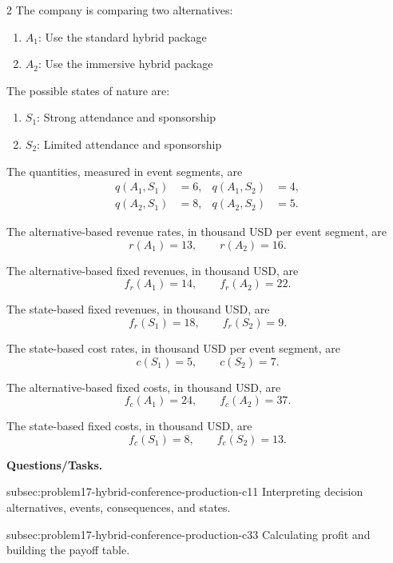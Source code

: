 \begin{multicols}{2}
	The company is comparing two alternatives:
	\begin{enumerate}[label=\arabic*.]
		\item \(A_1\): Use the standard hybrid package
		\item \(A_2\): Use the immersive hybrid package
	\end{enumerate}
	
	The possible states of nature are:
	\begin{enumerate}[label=\arabic*.]
		\item \(S_1\): Strong attendance and sponsorship
		\item \(S_2\): Limited attendance and sponsorship
	\end{enumerate}
	
	\columnbreak
	
	The quantities, measured in event segments, are
	\[
	\begin{aligned}
		q(A_1,S_1)&=6,
		&
		q(A_1,S_2)&=4,
		\\
		q(A_2,S_1)&=8,
		&
		q(A_2,S_2)&=5.
	\end{aligned}
	\]
	
	The alternative-based revenue rates, in thousand USD per event segment,
	are
	\[
	r(A_1)=13,
	\qquad
	r(A_2)=16.
	\]
	
	The alternative-based fixed revenues, in thousand USD, are
	\[
	f_r(A_1)=14,
	\qquad
	f_r(A_2)=22.
	\]
	
	The state-based fixed revenues, in thousand USD, are
	\[
	f_r(S_1)=18,
	\qquad
	f_r(S_2)=9.
	\]
	
	The state-based cost rates, in thousand USD per event segment, are
	\[
	c(S_1)=5,
	\qquad
	c(S_2)=7.
	\]
	
	The alternative-based fixed costs, in thousand USD, are
	\[
	f_c(A_1)=24,
	\qquad
	f_c(A_2)=37.
	\]
	
	The state-based fixed costs, in thousand USD, are
	\[
	f_c(S_1)=8,
	\qquad
	f_c(S_2)=13.
	\]
\end{multicols}

\textbf{Questions/Tasks.}
\begin{enumerate}
	\CriterionTask
	{subsec:problem17-hybrid-conference-production-c1}{1}
	{Interpreting decision alternatives, events, consequences, and states.}

	\CriterionTask
	{subsec:problem17-hybrid-conference-production-c3}{3}
	{Calculating profit and building the payoff table.}
\end{enumerate}

